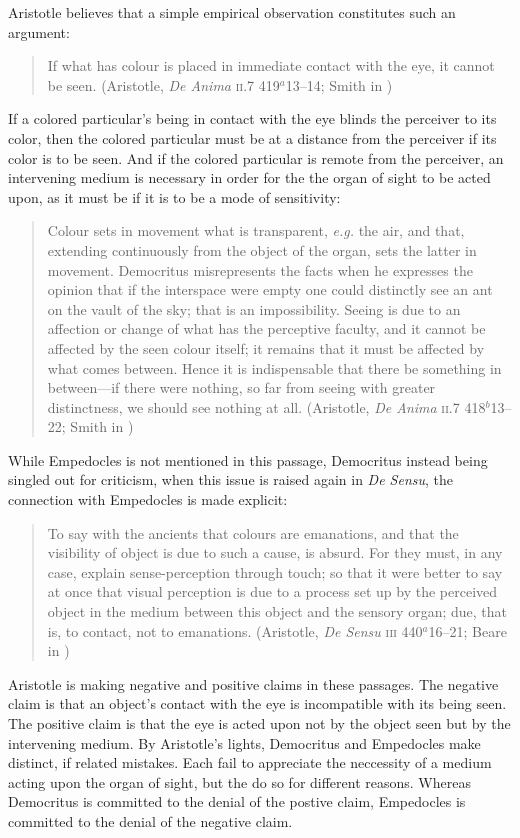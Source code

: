 Aristotle believes that a simple empirical observation constitutes such an argument:
\begin{quote}
	If what has colour is placed in immediate contact with the eye, it cannot be seen. (Aristotle, \emph{De Anima} \textsc{ii}.7 419\( ^{a} \)13--14; Smith in \citealt[]{Barnes:1984uq})
\end{quote}
If a colored particular's being in contact with the eye blinds the perceiver to its color, then the colored particular must be at a distance from the perceiver if its color is to be seen. And if the colored particular is remote from the perceiver, an intervening medium is necessary in order for the the organ of sight to be acted upon, as it must be if it is to be a mode of sensitivity:
\begin{quote}
	Colour sets in movement what is transparent, \emph{e.g.} the air, and that, extending continuously from the object of the organ, sets the latter in movement. Democritus misrepresents the facts when he expresses the opinion that if the interspace were empty one could distinctly see an ant on the vault of the sky; that is an impossibility. Seeing is due to an affection or change of what has the perceptive faculty, and it cannot be affected by the seen colour itself; it remains that it must be affected by what comes between. Hence it is indispensable that there be something in between---if there were nothing, so far from seeing with greater distinctness, we should see nothing at all. (Aristotle, \emph{De Anima} \textsc{ii}.7 418\( ^{b} \)13--22; Smith in \citealt[33--34]{Barnes:1984uq})
\end{quote}

While Empedocles is not mentioned in this passage, Democritus instead being singled out for criticism, when this issue is raised again in \emph{De Sensu}, the connection with Empedocles is made explicit:
\begin{quote}
	To say with the ancients that colours are emanations, and that the visibility of object is due to such a cause, is absurd. For they must, in any case, explain sense-perception through touch; so that it were better to say at once that visual perception is due to a process set up by the perceived object in the medium between this object and the sensory organ; due, that is, to contact, not to emanations. (Aristotle, \emph{De Sensu} \textsc{iii} 440\( ^{a} \)16--21; Beare in \citealt[9]{Barnes:1984uq})
\end{quote}

Aristotle is making negative and positive claims in these passages. The negative claim is that an object's contact with the eye is incompatible with its being seen. The positive claim is that the eye is acted upon not by the object seen but by the intervening medium. By Aristotle's lights, Democritus and Empedocles make distinct, if related mistakes. Each fail to appreciate the neccessity of a medium acting upon the organ of sight, but the do so for different reasons. Whereas Democritus is committed to the denial of the postive claim, Empedocles is committed to the denial of the negative claim.

